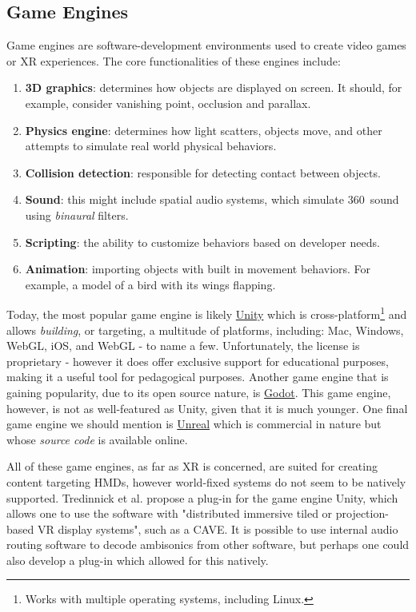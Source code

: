 \subsection{Game Engines}

Game engines are software-development environments used to create video games or XR experiences. The core functionalities of these engines include:

\begin{enumerate}
    \item \textbf{3D graphics}: determines how objects are displayed on screen. It should, for example, consider vanishing point, occlusion and parallax. 
    \item \textbf{Physics engine}: determines how light scatters, objects move, and other attempts to simulate real world physical behaviors. 
    \item \textbf{Collision detection}: responsible for detecting contact between objects. 
    \item \textbf{Sound}: this might include spatial audio systems, which simulate 360\textdegree \ sound using \textit{binaural} filters.
    \item \textbf{Scripting}: the ability to customize behaviors based on developer needs. 
    \item \textbf{Animation}: importing objects with built in movement behaviors. For example, a model of a bird with its wings flapping.
\end{enumerate}

Today, the most popular game engine is likely \href{https://unity.com/}{Unity} which is cross-platform\footnote{Works with multiple operating systems, including Linux.} and allows \textit{building}, or targeting, a multitude of platforms, including: Mac, Windows, WebGL, iOS, and WebGL - to name a few. Unfortunately, the license is proprietary - however it does offer exclusive support for educational purposes, making it a useful tool for pedagogical purposes. Another game engine that is gaining popularity, due to its open source nature, is \href{https://godotengine.org/}{Godot}. This game engine, however, is not as well-featured as Unity, given that it is much younger. One final game engine we should mention is \href{https://www.unrealengine.com/en-US/}{Unreal} which is commercial in nature but whose \textit{source code} is available online. 

All of these game engines, as far as XR is concerned, are suited for creating content targeting HMDs, however world-fixed systems do not seem to be natively supported. Tredinnick et al. \cite{unicave2017} propose a plug-in for the game engine Unity, which allows one to use the software with "distributed immersive tiled or projection-based VR display systems", such as a CAVE. It is possible to use internal audio routing software to decode ambisonics from other software, but perhaps one could also develop a plug-in which allowed for this natively. 

